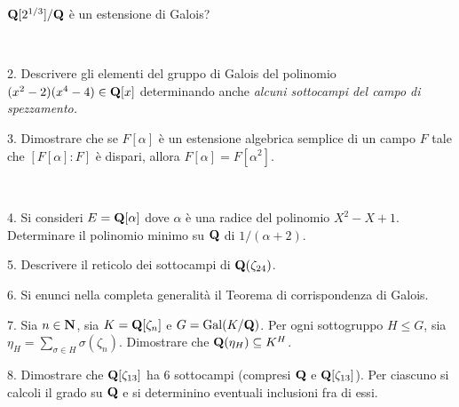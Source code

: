  ${\bf Q}[2^{1/3}]/{\bf Q}$ \`e un estensione di Galois?\medskip\bigskip\bigskip

\ \dotfill\ \bigskip\bigskip\bigskip


\vfil\eject


\item{2.} Descrivere gli elementi del gruppo di Galois del
polinomio $(x^2-2)(x^4-4)\in{\bf Q}[x]$ determinando anche \it alcuni \rm sottocampi
 del campo di spezzamento.\vv


\item{3.} Dimostrare che se $F[\alpha]$ \`e un estensione algebrica semplice
di un campo $F$ tale che $[F[\alpha]:F]$ \`e dispari, allora $F[\alpha]=F[\alpha^2]$. 

\ve\ \vs


\item{4.} Si consideri $E={\bf Q}[\alpha]$ dove $\alpha$ \`{e}
una radice del polinomio $X^2-X+1$. Determinare il polinomio minimo
su ${\bf Q}$ di $1/(\alpha+2)$. \vv

\item{5.} Descrivere il reticolo dei sottocampi di ${\bf Q}(\zeta_{24})$.
\ve\ \vs


\item{6.} Si enunci nella completa generalit\`a il Teorema di
corrispondenza di Galois.\vv\vv


\item{7.} Sia $n\in{\bf N}$, sia $K={\bf Q}[\zeta_n]$ e $G={\rm Gal}(K/{\bf Q})$. Per ogni sottogruppo
$H\leq G$, sia $\eta_H=\sum_{\sigma\in H}\sigma(\zeta_n)$. Dimostrare che ${\bf Q}(\eta_H)\subseteq K^H$. \vv\vv

\item{8.} Dimostrare che ${\bf Q}[\zeta_{13}]$ ha 6 sottocampi (compresi ${\bf Q}$ e ${\bf Q}[\zeta_{13}]$).
Per ciascuno si calcoli il grado su ${\bf Q}$ e si determinino eventuali inclusioni fra di essi.

\vv



\ \vst
 \bye
